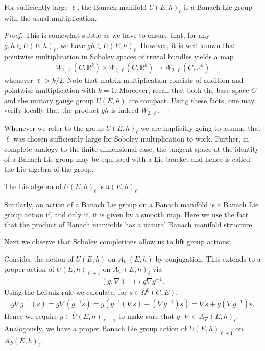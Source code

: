 \documentclass[12pt]{ociamthesis}  %
\begin{document}
\begin{example}\label{ex:unitary_banach_lie_group}
  For sufficiently large $\ell$, the Banach manifold $U(E,h)_\ell$ is a
  Banach Lie group with the usual multiplication.
  \begin{proof}
    This is somewhat subtle as we have to ensure that, for any
    $g,h\in U(E,h)_\ell$, we have $gh\in U(E,h)_\ell$. However, it
    is well-known that pointwise multiplication
    in Sobolev spaces of trivial bundles yields a map
    \begin{align*}
      W_{2,\ell}(C,\mathbb R^k) \times
      W_{2,\ell}(C,\mathbb R^k) \to
      W_{2,\ell}(C,\mathbb R^k)
    \end{align*}
    whenever $\ell > k/2$. \cite[Theorem 6.1]{behzadan2021}
    Note that matrix multiplication consists of addition and
    pointwise multiplication with $k=1$. Moreover, recall that both
    the base space $C$ and the unitary gauge group $U(E,h)$ are compact.
    Using these facts, one may verify locally that the product $gh$ is indeed $W_{2,\ell}$.
  \end{proof}
\end{example}

Whenever we refer to the group $U(E,h)_\ell$ we are implicitly going to
assume that $\ell$ was chosen sufficiently large for Sobolev multiplication
to work.
Further, in complete analogy to the finite dimensional case, the tangent space
at the identity of a Banach Lie group may be equipped with a Lie bracket
and hence is called the Lie algebra of the group.

\begin{example}
  The Lie algebra of $U(E,h)_\ell$ is $\mathfrak u(E,h)_\ell$.
\end{example}

Similarly, an action of a Banach Lie group on a Banach manifold
is a Banach Lie group action if, and only if, it is given by a
smooth map. Here we use the fact that the product of Banach manifolds
has a natural Banach manifold structure.

Next we observe that Sobolev completions allow us to lift group
actions:

\begin{example}
  Consider the action of $U(E,h)$ on $A_\nabla(E,h)$
  by conjugation. This extends to a proper action of $U(E,h)_{\ell+1}$
  on $A_\nabla(E,h)_\ell$ via
  \begin{align*}
    (g,\nabla) & \mapsto g\nabla g^{-1}.
  \end{align*}
  Using the Leibniz rule we calculate, for $s\in\Omega^0(C,E)$,
  \begin{align*}
    g\nabla g^{-1}(s) = g\nabla(g^{-1}s) = g(g^{-1}(\nabla s) + (\nabla g^{-1})s)
    = \nabla s + g(\nabla g^{-1})s.
  \end{align*}
  Hence we require $g\in U(E,h)_{\ell + 1}$ to make sure that $g\cdot\nabla\in A_\nabla(E,h)_\ell$.
  Analogously, we have a proper Banach Lie group action of $U(E,h)_{\ell+1}$
  on $A_\Phi(E,h)_\ell$.
\end{example}
\end{document}
